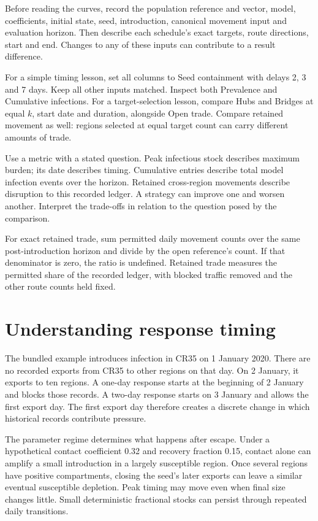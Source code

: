 \documentclass[11pt,a4paper]{article}
\begin{document}
Before reading the curves, record the population reference and vector,
model, coefficients, initial state, seed, introduction, canonical
movement input and evaluation horizon. Then describe each schedule's
exact targets, route directions, start and end. Changes to any of these
inputs can contribute to a result difference.

For a simple timing lesson, set all columns to Seed containment with
delays 2, 3 and 7 days. Keep all other inputs matched. Inspect both
Prevalence and Cumulative infections. For a target-selection lesson,
compare Hubs and Bridges at equal \(k\), start date and duration,
alongside Open trade. Compare retained movement as well: regions
selected at equal target count can carry different amounts of trade.

Use a metric with a stated question. Peak infectious stock describes
maximum burden; its date describes timing. Cumulative entries describe
total model infection events over the horizon. Retained cross-region
movements describe disruption to this recorded ledger. A strategy can
improve one and worsen another. Interpret the trade-offs in relation to
the question posed by the comparison.

For exact retained trade, sum permitted daily movement counts over the
same post-introduction horizon and divide by the open reference's count.
If that denominator is zero, the ratio is undefined. Retained trade
measures the permitted share of the recorded ledger, with blocked
traffic removed and the other route counts held fixed.

\section{Understanding response
timing}\label{understanding-response-timing}

The bundled example introduces infection in CR35 on 1 January 2020.
There are no recorded exports from CR35 to other regions on that day. On
2 January, it exports to ten regions. A one-day response starts at the
beginning of 2 January and blocks those records. A two-day response
starts on 3 January and allows the first export day. The first export
day therefore creates a discrete change in which historical records
contribute pressure.

The parameter regime determines what happens after escape. Under a
hypothetical contact coefficient 0.32 and recovery fraction 0.15,
contact alone can amplify a small introduction in a largely susceptible
region. Once several regions have positive compartments, closing the
seed's later exports can leave a similar eventual susceptible depletion.
Peak timing may move even when final size changes little. Small
deterministic fractional stocks can persist through repeated daily
transitions.
\end{document}
